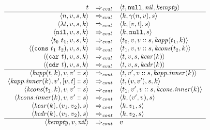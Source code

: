 \documentclass{article}
\begin{document}
\[
\begin{array}{rll}
  t 
  & \Rightarrow_\mathit{eval} & 
  \langle t, \mathtt{null}, \mathit{nil}, \mathit{kempty} \rangle \\
  \hline

  \langle n, v, s, k \rangle 
  & \Rightarrow_\mathit{eval} & 
  \langle k, \gamma(n, v), s \rangle \\

  \langle \lambda t, v, s, k \rangle 
  & \Rightarrow_\mathit{eval} & 
  \langle k, [v, t], s \rangle \\

  \langle \mathtt{nil}, v, s, k \rangle 
  & \Rightarrow_\mathit{eval} & 
  \langle k, \mathtt{null}, s \rangle \\

  \langle t_0~t_1, v, s, k \rangle 
  & \Rightarrow_\mathit{eval} & 
  \langle t_0, v, v :: s, \mathit{kapp}(t_1, k) \rangle \\

  \langle (\mathtt{cons}~t_1~t_2), v, s, k \rangle 
  & \Rightarrow_\mathit{eval} & 
  \langle t_1, v, v :: s, \mathit{kcons}(t_2, k) \rangle \\

  \langle (\mathtt{car}~t), v, s, k \rangle 
  & \Rightarrow_\mathit{eval} & 
  \langle t, v, s, \mathit{kcar}(k) \rangle \\

  \langle (\mathtt{cdr}~t), v, s, k \rangle 
  & \Rightarrow_\mathit{eval} & 
  \langle t, v, s, \mathit{kcdr}(k) \rangle \\

  \hline

  \langle \mathit{kapp}(t, k), v, v' :: s \rangle 
  & \Rightarrow_\mathit{cont} & 
  \langle t, v', v :: s, \mathit{kapp.inner}(k) \rangle \\

  \langle \mathit{kapp.inner}(k), v', [v, t] :: s \rangle 
  & \Rightarrow_\mathit{cont} & 
  \langle t, (v, v'), s, k \rangle \\

  \langle \mathit{kcons}(t_1, k), v, v' :: s \rangle 
  & \Rightarrow_\mathit{cont} & 
  \langle t_1, v', v :: s, \mathit{kcons.inner}(k) \rangle \\

  \langle \mathit{kcons.inner}(k), v, v' :: s \rangle 
  & \Rightarrow_\mathit{cont} & 
  \langle k, (v', v), s \rangle \\

  \langle \mathit{kcar}(k), (v_1, v_2), s \rangle 
  & \Rightarrow_\mathit{cont} & 
  \langle k, v_1, s \rangle \\

  \langle \mathit{kcdr}(k), (v_1, v_2), s \rangle 
  & \Rightarrow_\mathit{cont} & 
  \langle k, v_2, s \rangle \\

  \hline

  \langle \mathit{kempty}, v, \mathit{nil} \rangle 
  & \Rightarrow_\mathit{cont} & 
  v \\

\end{array}
\]
\end{document}
